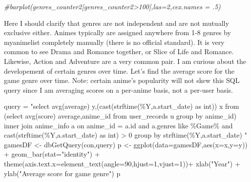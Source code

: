 \documentclass[
]{article}
\newenvironment{Shaded}{\begin{snugshade}}{\end{snugshade}}
\newcommand{\AttributeTok}[1]{\textcolor[rgb]{0.77,0.63,0.00}{#1}}
\newcommand{\CommentTok}[1]{\textcolor[rgb]{0.56,0.35,0.01}{\textit{#1}}}
\newcommand{\DecValTok}[1]{\textcolor[rgb]{0.00,0.00,0.81}{#1}}
\newcommand{\FunctionTok}[1]{\textcolor[rgb]{0.00,0.00,0.00}{#1}}
\newcommand{\NormalTok}[1]{#1}
\newcommand{\OtherTok}[1]{\textcolor[rgb]{0.56,0.35,0.01}{#1}}
\newcommand{\SpecialCharTok}[1]{\textcolor[rgb]{0.00,0.00,0.00}{#1}}
\newcommand{\StringTok}[1]{\textcolor[rgb]{0.31,0.60,0.02}{#1}}
\begin{document}
\begin{Shaded}
\begin{Highlighting}[]
\CommentTok{\#barplot(genres\_counter2[genres\_counter2\textgreater{}100],las=2,cex.names = .5)}
\end{Highlighting}
\end{Shaded}

Here I should clarify that genres are not independent and are not
mutually exclusive either. Animes typically are assigned anywhere from
1-8 genres by myanimelist completely manually (there is no official
standard). It is very common to see Drama and Romance together, or Slice
of Life and Romance. Likewise, Action and Adventure are a very common
pair. I am curious about the developement of certain genres over time.
Let's find the average score for the game genre over time. Note: certain
anime's popularity will not skew this SQL query since I am averaging
scores on a per-anime basis, not a per-user basis.

\begin{Shaded}
\begin{Highlighting}[]
\NormalTok{query }\OtherTok{=} \StringTok{"select avg(average) y,(cast(strftime(\textquotesingle{}\%Y\textquotesingle{},a.start\_date) as int)) x from }
\StringTok{(select avg(score) average,anime\_id from user\_records u group by anime\_id)  inner join anime\_info a on anime\_id = a.id and a.genres like \textquotesingle{}\%Game\%\textquotesingle{} }
\StringTok{and cast(strftime(\textquotesingle{}\%Y\textquotesingle{},a.start\_date) as int) \textgreater{} 0}
\StringTok{group by strftime(\textquotesingle{}\%Y\textquotesingle{},a.start\_date) "}
\NormalTok{gamesDF }\OtherTok{\textless{}{-}} \FunctionTok{dbGetQuery}\NormalTok{(con,query)}
\NormalTok{p }\OtherTok{\textless{}{-}} \FunctionTok{ggplot}\NormalTok{(}\AttributeTok{data=}\NormalTok{gamesDF,}\FunctionTok{aes}\NormalTok{(}\AttributeTok{x=}\NormalTok{x,}\AttributeTok{y=}\NormalTok{y)) }\SpecialCharTok{+}
  \FunctionTok{geom\_bar}\NormalTok{(}\AttributeTok{stat=}\StringTok{"identity"}\NormalTok{) }\SpecialCharTok{+}
  \FunctionTok{theme}\NormalTok{(}\AttributeTok{axis.text.x=}\FunctionTok{element\_text}\NormalTok{(}\AttributeTok{angle=}\DecValTok{90}\NormalTok{,}\AttributeTok{hjust=}\DecValTok{1}\NormalTok{,}\AttributeTok{vjust=}\DecValTok{1}\NormalTok{))}\SpecialCharTok{+}
  \FunctionTok{xlab}\NormalTok{(}\StringTok{"Year"}\NormalTok{) }\SpecialCharTok{+} \FunctionTok{ylab}\NormalTok{(}\StringTok{"Average score for game genre"}\NormalTok{)}
\NormalTok{p}
\end{Highlighting}
\end{Shaded}
\end{document}
